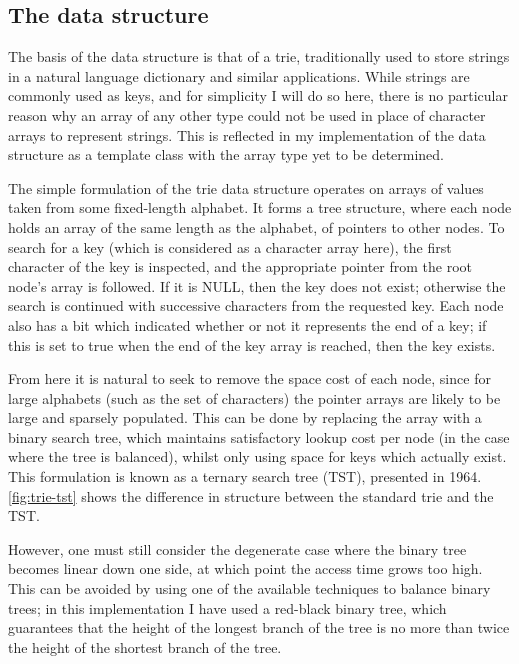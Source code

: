 \documentclass[a4paper,12pt,twoside,openright]{report}
\begin{document}
	\subsection{The data structure}
	
	The basis of the data structure is that of a trie, traditionally used to store strings in a natural language dictionary and similar applications. While strings are commonly used as keys, and for simplicity I will do so here, there is no particular reason why an array of any other type could not be used in place of character arrays to represent strings. This is reflected in my implementation of the data structure as a template class with the array type yet to be determined.
	
	The simple formulation of the trie data structure operates on arrays of values taken from some fixed-length alphabet. It forms a tree structure, where each node holds an array of the same length as the alphabet, of pointers to other nodes. To search for a key (which is considered as a character array here), the first character of the key is inspected, and the appropriate pointer from the root node's array is followed. If it is NULL, then the key does not exist; otherwise the search is continued with successive characters from the requested key. Each node also has a bit which indicated whether or not it represents the end of a key; if this is set to true when the end of the key array is reached, then the key exists.
	
	From here it is natural to seek to remove the space cost of each node, since for large alphabets (such as the set of characters) the pointer arrays are likely to be large and sparsely populated. This can be done by replacing the array with a binary search tree, which maintains satisfactory lookup cost per node (in the case where the tree is balanced), whilst only using space for keys which actually exist. This formulation is known as a ternary search tree (TST), presented in 1964\cite{Clampett-ternary}. \figurename{ \ref{fig:trie-tst}} shows the difference in structure between the standard trie and the TST.
	
	However, one must still consider the degenerate case where the binary tree becomes linear down one side, at which point the access time grows too high. This can be avoided by using one of the available techniques to balance binary trees; in this implementation I have used a red-black binary tree, which guarantees that the height of the longest branch of the tree is no more than twice the height of the shortest branch of the tree.
	
\end{document}
